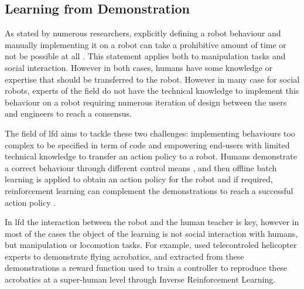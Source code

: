 \subsection{Learning from Demonstration} \label{ssec:back_lfd}
	As stated by numerous researchers, explicitly defining a robot behaviour and manually implementing it on a robot can take a prohibitive amount of time or not be possible at all \citep{argall2009survey,billard2008robot}. This statement applies both to manipulation tasks and social interaction. However in both cases, humans have some knowledge or expertise that should be transferred to the robot. However in many case for social robots, experts of the field do not have the technical knowledge to implement this behaviour on a robot requiring numerous iteration of design between the users and engineers to reach a consensus. 
	
	    
	The field of \acrfull{lfd} aims to tackle these two challenges: implementing behaviours too complex to be specified in term of code and empowering end-users with limited technical knowledge to transfer an action policy to a robot. Humans demonstrate a correct behaviour through different control means \citep{argall2009survey}, and then offline batch learning is applied to obtain an action policy for the robot and if required, reinforcement learning can complement the demonstrations to reach a successful action policy \citep{billard2008robot}.
	
	In \gls{lfd} the interaction between the robot and the human teacher is key, however in most of the cases the object of the learning is not social interaction with humans, but manipulation or locomotion tasks. For example, \cite{abbeel2004apprenticeship} used telecontroled helicopter experts to demonstrate flying acrobatics, and extracted from these demonstrations a reward function used to train a controller to reproduce these acrobatics at a super-human level through Inverse Reinforcement Learning. %
	
